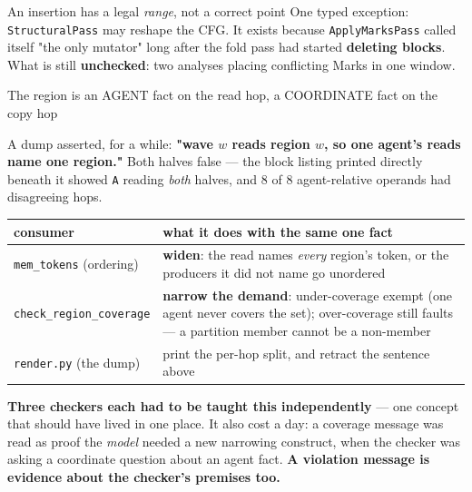 \documentclass[aspectratio=169,9pt]{beamer}
\newcommand{\key}[1]{\textcolor{acc}{\textbf{#1}}}
\newcommand{\bad}[1]{\textcolor{warn}{\textbf{#1}}}
\newcommand{\good}[1]{\textcolor{ok}{\textbf{#1}}}
\begin{document}
\begin{frame}{An insertion has a legal \emph{range}, not a correct point}
\vspace{3pt}
{\scriptsize One typed exception: \texttt{StructuralPass} may reshape the CFG. It exists because
\texttt{ApplyMarksPass} called itself "the only mutator" long after the fold pass had started
\bad{deleting blocks}. What is still \bad{unchecked}: two analyses placing conflicting Marks in one window.}
\end{frame}

\begin{frame}{The region is an AGENT fact on the read hop, a COORDINATE fact on the copy hop}
\centering
{}

\vspace{4pt}
{\scriptsize A dump asserted, for a while: \bad{"wave $w$ reads region $w$, so one agent's reads name
one region."} Both halves false --- the block listing printed directly beneath it showed \texttt{A}
reading \emph{both} halves, and 8 of 8 agent-relative operands had disagreeing hops.}

\vspace{4pt}
\scriptsize
\begin{tabular}{@{}lp{7.3cm}@{}}
\toprule
consumer & what it does with the same one fact \\
\midrule
\texttt{mem\_tokens} (ordering) & \good{widen}: the read names \emph{every} region's token, or the producers it did not name go unordered \\
\texttt{check\_region\_coverage} & \good{narrow the demand}: under-coverage exempt (one agent never covers the set); over-coverage still faults --- a partition member cannot be a non-member \\
\texttt{render.py} (the dump) & print the per-hop split, and retract the sentence above \\
\bottomrule
\end{tabular}

\vspace{4pt}
{\scriptsize \bad{Three checkers each had to be taught this independently} --- one concept that
should have lived in one place. It also cost a day: a coverage message was read as proof the
\emph{model} needed a new narrowing construct, when the checker was asking a coordinate question
about an agent fact. \key{A violation message is evidence about the checker's premises too.}}
\end{frame}
\end{document}
